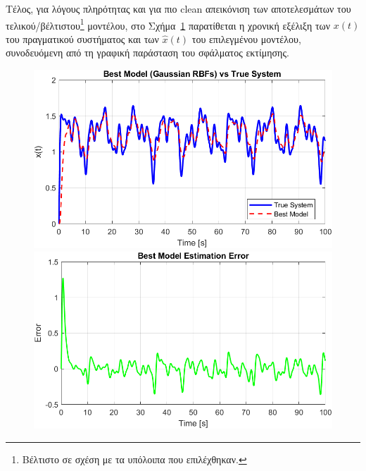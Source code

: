 \documentclass[12pt]{article} %
\numberwithin{equation}{section}  %
\begin{document}
Τέλος, για λόγους πληρότητας και για πιο clean απεικόνιση των αποτελεσμάτων του τελικού/βέλτιστου\footnote{
Βέλτιστο σε σχέση με τα υπόλοιπα που επιλέχθηκαν.
} 
μοντέλου, στο Σχήμα~\ref{fig:best_} παρατίθεται η χρονική εξέλιξη των $x(t)$ του πραγματικού συστήματος 
και των $\hat{x}(t)$ του επιλεγμένου μοντέλου, συνοδευόμενη από τη γραφική παράσταση του σφάλματος εκτίμησης.

\begin{figure}[ht!]
    \centering
    \begin{minipage}{0.49\textwidth}
        \centering
        \includegraphics[width=0.9\linewidth]{plots/plotB_4_best.png}
    \end{minipage}
    \hfill
    \begin{minipage}{0.49\textwidth}
        \centering
        \includegraphics[width=0.9\linewidth]{plots/plotB_5_best_err.png}
    \end{minipage}

    \caption{}
    \label{fig:best_}
\end{figure}
\end{document}

